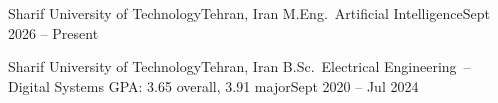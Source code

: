 \resumeSubheading
  {Sharif University of Technology}{Tehran, Iran}
  {M.Eng.\ Artificial Intelligence}{Sept 2026 -- Present}
\begin{resumeItemList}
\end{resumeItemList}

\resumeSubheading
  {Sharif University of Technology}{Tehran, Iran}
  {B.Sc.\ Electrical Engineering~-- Digital Systems \quad GPA: 3.65 overall, 3.91 major}{Sept 2020 -- Jul 2024}
\begin{resumeItemList}
\end{resumeItemList}
